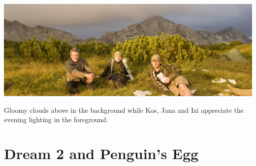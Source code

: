\begin{pagefigure}
\checkoddpage \ifoddpage \forcerectofloat \else \forceversofloat \fi
   \centering
\includegraphics[width = \textwidth]{2011/winter_journey/2011-08-03-18.18.52-Jana Carga-Canon 350D--orig.jpg}
\caption{Gloomy clouds above  in the background while Kos, Jana and Izi appreciate the evening lighting in the foreground. } \label{gloom surface}
\end{pagefigure}


\newpage

\section{Dream 2 and Penguin's Egg}

